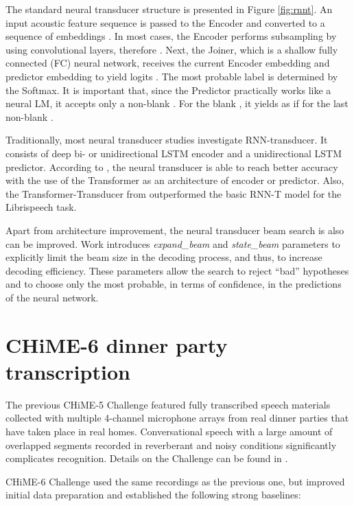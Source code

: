 \documentclass[a4paper]{article}
\begin{document}
The standard neural transducer structure is presented in Figure \ref{fig:rnnt}. An input acoustic feature sequence  is passed to the Encoder and converted to a sequence of embeddings . In most cases, the Encoder performs subsampling by using convolutional layers, therefore . Next, the Joiner, which is a shallow fully connected (FC) neural network, receives the current Encoder embedding  and predictor embedding  to yield logits . The most probable label  is determined by the Softmax. It is important that, since the Predictor practically works like a neural LM, it accepts only a non-blank . For the blank , it yields  as if for the last non-blank .

Traditionally, most neural transducer studies investigate RNN-transducer. It consists of deep bi- or unidirectional LSTM encoder and a unidirectional LSTM predictor. According to \cite{Tian_2019}, the neural transducer is able to reach better accuracy with the use of the Transformer as an architecture of encoder or predictor. Also, the Transformer-Transducer from \cite{yeh2019transformertransducer} outperformed the basic RNN-T model for the Librispeech task.

Apart from architecture improvement, the neural transducer beam search is also can be improved. Work \cite{jain2019rnnt} introduces \textit{expand\_beam} and \textit{state\_beam} parameters to explicitly limit the beam size in the decoding process, and thus, to increase decoding efficiency. These parameters allow the search to reject ``bad'' hypotheses and to choose only the most probable, in terms of confidence, in the predictions of the neural network.

\section{CHiME-6 dinner party transcription}
\label{section:chime6}

The previous CHiME-5 Challenge featured fully transcribed speech materials collected with multiple 4-channel microphone arrays from real dinner parties that have taken place in real homes. Conversational speech with a large amount of overlapped segments recorded in reverberant and noisy conditions significantly complicates recognition. Details on the Challenge can be found in \cite{barker2018fifth}.

CHiME-6 Challenge \cite{chime6} used the same recordings as the previous one, but improved initial data preparation and established the following strong baselines:
\end{document}
